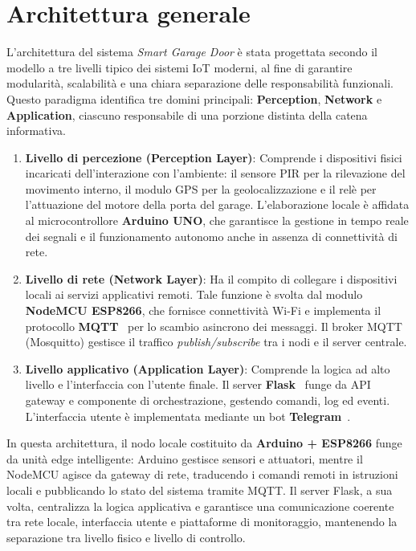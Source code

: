 \section{Architettura generale}

L’architettura del sistema \textit{Smart Garage Door} è stata progettata secondo il modello a tre livelli tipico dei sistemi IoT moderni, al fine di garantire modularità, scalabilità e una chiara separazione delle responsabilità funzionali. Questo paradigma identifica tre domini principali: \textbf{Perception}, \textbf{Network} e \textbf{Application}, ciascuno responsabile di una porzione distinta della catena informativa.

\begin{enumerate}
    \item \textbf{Livello di percezione (Perception Layer)}:
    Comprende i dispositivi fisici incaricati dell’interazione con l’ambiente: il sensore PIR per la rilevazione del movimento interno, il modulo GPS per la geolocalizzazione e il relè per l’attuazione del motore della porta del garage.  
    L’elaborazione locale è affidata al microcontrollore \textbf{Arduino UNO}, che garantisce la gestione in tempo reale dei segnali e il funzionamento autonomo anche in assenza di connettività di rete.

    \item \textbf{Livello di rete (Network Layer)}:
    Ha il compito di collegare i dispositivi locali ai servizi applicativi remoti. Tale funzione è svolta dal modulo \textbf{NodeMCU ESP8266}, che fornisce connettività Wi-Fi e implementa il protocollo \textbf{MQTT}~\cite{MQTTspec} per lo scambio asincrono dei messaggi.  
    Il broker MQTT (Mosquitto) gestisce il traffico \textit{publish/subscribe} tra i nodi e il server centrale.

    \item \textbf{Livello applicativo (Application Layer)}:
    Comprende la logica ad alto livello e l’interfaccia con l’utente finale.  
    Il server \textbf{Flask}~\cite{Flask2024} funge da API gateway e componente di orchestrazione, gestendo comandi, log ed eventi.  
    L’interfaccia utente è implementata mediante un bot \textbf{Telegram}~\cite{TelegramAPI}.
\end{enumerate}

In questa architettura, il nodo locale costituito da \textbf{Arduino + ESP8266} funge da unità edge intelligente: Arduino gestisce sensori e attuatori, mentre il NodeMCU agisce da gateway di rete, traducendo i comandi remoti in istruzioni locali e pubblicando lo stato del sistema tramite MQTT.  
Il server Flask, a sua volta, centralizza la logica applicativa e garantisce una comunicazione coerente tra rete locale, interfaccia utente e piattaforme di monitoraggio, mantenendo la separazione tra livello fisico e livello di controllo.




